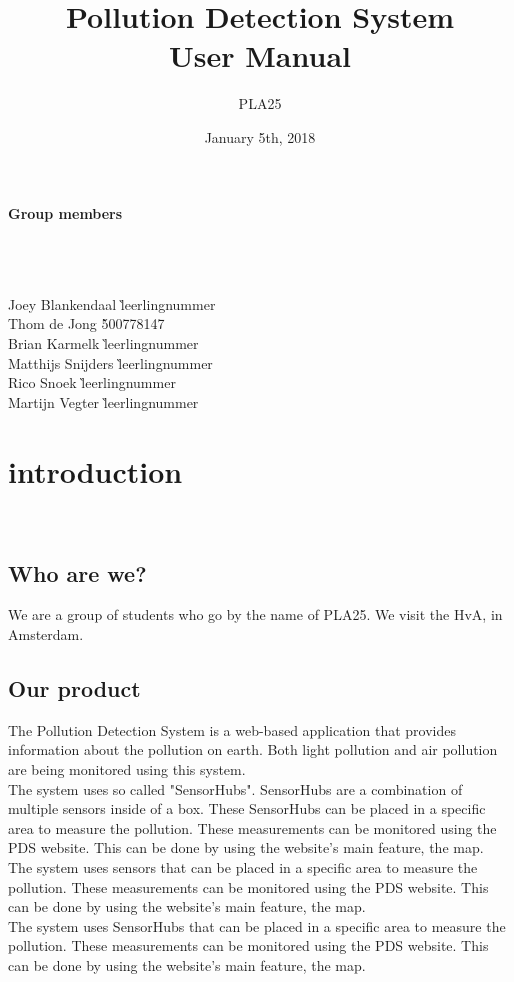 \documentclass[a4paper]{article}
\title{Pollution Detection System\\User Manual}
\author{PLA25}
\date{January 5th, 2018}
\begin{document}
\clearpage
\maketitle
\vspace*{\fill}
\paragraph{Group members}
~\\\\
\begin{tabbing}
Joey Blankendaal \` leerlingnummer
\\
Thom de Jong \` 500778147
\\
Brian Karmelk \` leerlingnummer
\\
Matthijs Snijders \` leerlingnummer
\\
Rico Snoek \` leerlingnummer
\\
Martijn Vegter \` leerlingnummer
\end{tabbing}
\thispagestyle{empty}
\setcounter{page}{0}
\pagebreak
\tableofcontents
\pagebreak

\section{introduction}
~\\

\subsection{Who are we?}
We are a group of students who go by the name of PLA25. We visit the HvA, in Amsterdam.
~\\

\subsection{Our product}
The Pollution Detection System is a web-based application that provides information about the pollution on earth. Both light pollution and air pollution are being monitored using this system.
\\
The system uses so called "SensorHubs". SensorHubs are a combination of multiple sensors inside of a box. These SensorHubs can be placed in a specific area to measure the pollution. These measurements can be monitored using the PDS website. This can be done by using the website's main feature, the map.
The system uses sensors that can be placed in a specific area to measure the pollution. These measurements can be monitored using the PDS website. This can be done by using the website's main feature, the map.
\\
The system uses SensorHubs that can be placed in a specific area to measure the pollution. These measurements can be monitored using the PDS website. This can be done by using the website's main feature, the map.
\end{document}
